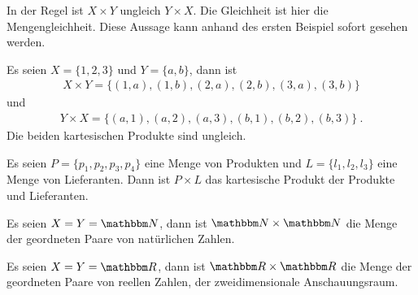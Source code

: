 \begin{Unit}[Beispiel]
In der Regel ist $X \times Y$ ungleich $Y \times X$. Die Gleichheit ist
hier die Mengengleichheit. Diese Aussage kann anhand des ersten Beispiel
sofort gesehen werden.

  Es seien $X = \{1, 2, 3\}$ und $Y = \{a, b\}$, dann ist
  \begin{align}
    X \times Y = \{ (1,a), (1,b), (2,a), (2,b), (3,a), (3,b) \}
  \end{align}
  und
  \begin{align}
    Y \times X = \{ (a,1), (a,2), (a,3), (b,1), (b,2), (b,3) \} \ .
  \end{align}
  Die beiden kartesischen Produkte sind ungleich.
\end{Unit}

\begin{Unit}[Beispiel]
  Es seien $P = \{ p_1, p_2, p_3, p_4 \}$ eine Menge von Produkten und $L = 
  \{ l_1, l_2, l_3 \}$ eine Menge von Lieferanten. Dann ist $P \times L$ das 
  kartesische Produkt der Produkte und Lieferanten.
\end{Unit}

\begin{Unit}[Beispiel]
  Es seien $X = Y = \NN$, dann ist $\NN \times \NN$ die Menge der geordneten 
  Paare von natürlichen Zahlen.
\end{Unit}

\begin{Unit}[Beispiel]
  Es seien $X = Y = \RR$, dann ist $\RR \times \RR$ die Menge der geordneten 
  Paare von reellen Zahlen, der zweidimensionale Anschauungsraum.
\end{Unit}


